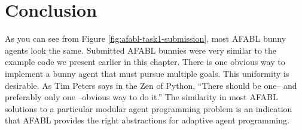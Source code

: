 \section{Conclusion}

As you can see from Figure \ref{fig:afabl-task1-submission}, most AFABL bunny agents look the same. Submitted AFABL bunnies were very similar to the example code we present earlier in this chapter. There is one obvious way to implement a bunny agent that must pursue multiple goals. This uniformity is desirable. As Tim Peters says in the Zen of Python, ``There should be one-- and preferably only one --obvious way to do it.'' The similarity in most AFABL solutions to a particular modular agent programming problem is an indication that AFABL provides the right abstractions for adaptive agent programming.
